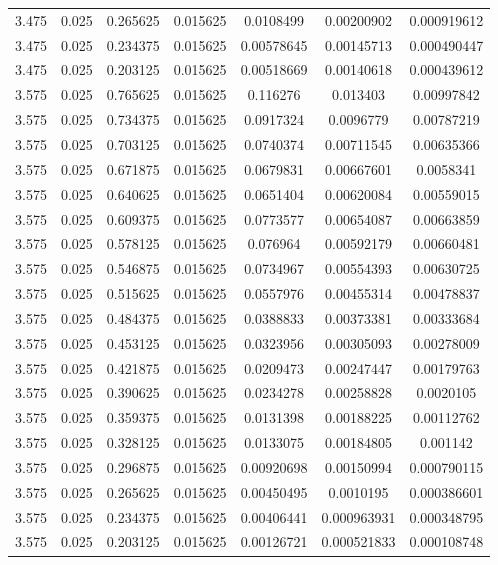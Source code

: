 \begin{flushleft}
\begin{longtable}{ccccccc}
3.475 & 0.025 & 0.265625 & 0.015625 & 0.0108499 & 0.00200902 & 0.000919612  \\ 
3.475 & 0.025 & 0.234375 & 0.015625 & 0.00578645 & 0.00145713 & 0.000490447  \\ 
3.475 & 0.025 & 0.203125 & 0.015625 & 0.00518669 & 0.00140618 & 0.000439612  \\ 
3.575 & 0.025 & 0.765625 & 0.015625 & 0.116276 & 0.013403 & 0.00997842  \\ 
3.575 & 0.025 & 0.734375 & 0.015625 & 0.0917324 & 0.0096779 & 0.00787219  \\ 
3.575 & 0.025 & 0.703125 & 0.015625 & 0.0740374 & 0.00711545 & 0.00635366  \\ 
3.575 & 0.025 & 0.671875 & 0.015625 & 0.0679831 & 0.00667601 & 0.0058341  \\ 
3.575 & 0.025 & 0.640625 & 0.015625 & 0.0651404 & 0.00620084 & 0.00559015  \\ 
3.575 & 0.025 & 0.609375 & 0.015625 & 0.0773577 & 0.00654087 & 0.00663859  \\ 
3.575 & 0.025 & 0.578125 & 0.015625 & 0.076964 & 0.00592179 & 0.00660481  \\ 
3.575 & 0.025 & 0.546875 & 0.015625 & 0.0734967 & 0.00554393 & 0.00630725  \\ 
3.575 & 0.025 & 0.515625 & 0.015625 & 0.0557976 & 0.00455314 & 0.00478837  \\ 
3.575 & 0.025 & 0.484375 & 0.015625 & 0.0388833 & 0.00373381 & 0.00333684  \\ 
3.575 & 0.025 & 0.453125 & 0.015625 & 0.0323956 & 0.00305093 & 0.00278009  \\ 
3.575 & 0.025 & 0.421875 & 0.015625 & 0.0209473 & 0.00247447 & 0.00179763  \\ 
3.575 & 0.025 & 0.390625 & 0.015625 & 0.0234278 & 0.00258828 & 0.0020105  \\ 
3.575 & 0.025 & 0.359375 & 0.015625 & 0.0131398 & 0.00188225 & 0.00112762  \\ 
3.575 & 0.025 & 0.328125 & 0.015625 & 0.0133075 & 0.00184805 & 0.001142  \\ 
3.575 & 0.025 & 0.296875 & 0.015625 & 0.00920698 & 0.00150994 & 0.000790115  \\ 
3.575 & 0.025 & 0.265625 & 0.015625 & 0.00450495 & 0.0010195 & 0.000386601  \\ 
3.575 & 0.025 & 0.234375 & 0.015625 & 0.00406441 & 0.000963931 & 0.000348795  \\ 
3.575 & 0.025 & 0.203125 & 0.015625 & 0.00126721 & 0.000521833 & 0.000108748  \\ 

\end{longtable}
\end{flushleft}
